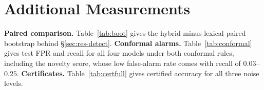 \documentclass[conference,compsoc]{IEEEtran}
\begin{document}
\section{Additional Measurements}
\label{app:extra}
\textbf{Paired comparison.} Table~\ref{tab:boot} gives the hybrid-minus-lexical paired bootstrap behind \S\ref{sec:res-detect}. \textbf{Conformal alarms.} Table~\ref{tab:conformal} gives test FPR and recall for all four models under both conformal rules, including the novelty score, whose low false-alarm rate comes with recall of $0.03$--$0.25$. \textbf{Certificates.} Table~\ref{tab:certfull} gives certified accuracy for all three noise levels.

\begin{table}[!tbp]
\centering
\caption{Hybrid minus lexical, paired bootstrap over test episodes ($2{,}000$ resamples, shared across the five seeds); $p$ for macro-F1 is Holm-adjusted across benchmarks.}
\label{tab:boot}
\scriptsize
\renewcommand{\arraystretch}{1.08}
\setlength{\tabcolsep}{3pt}
\end{table}
\end{document}
